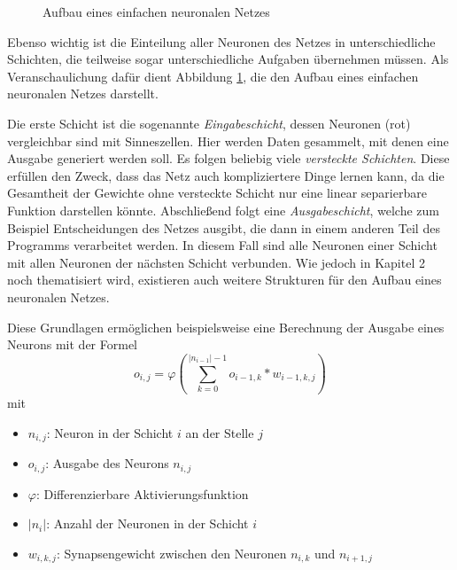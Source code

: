 \documentclass[12pt,a4]{article}
\begin{document}
\begin{figure}[!h]
\caption{Aufbau eines einfachen neuronalen Netzes}
\label{fig:Netzaufbau}
\end{figure}

Ebenso wichtig ist die Einteilung aller Neuronen des Netzes in unterschiedliche Schichten, die teilweise sogar unterschiedliche Aufgaben übernehmen müssen. Als Veranschaulichung dafür dient Abbildung \ref{fig:Netzaufbau}, die den Aufbau eines einfachen neuronalen Netzes darstellt. 

Die erste Schicht ist die sogenannte \textit{Eingabeschicht}, dessen Neuronen (rot) vergleichbar sind mit Sinneszellen. Hier werden Daten gesammelt, mit denen eine Ausgabe generiert werden soll. Es folgen beliebig viele \textit{versteckte Schichten}. Diese erfüllen den Zweck, dass das Netz auch kompliziertere Dinge lernen kann, da die Gesamtheit der Gewichte ohne versteckte Schicht nur eine linear separierbare Funktion darstellen könnte. Abschließend folgt eine \textit{Ausgabeschicht}, welche zum Beispiel Entscheidungen des Netzes ausgibt, die dann in einem anderen Teil des Programms verarbeitet werden. In diesem Fall sind alle Neuronen einer Schicht mit allen Neuronen der nächsten Schicht verbunden. Wie jedoch in Kapitel 2 noch thematisiert wird, existieren auch weitere Strukturen für den Aufbau eines neuronalen Netzes.

Diese Grundlagen ermöglichen beispielsweise eine Berechnung der Ausgabe eines Neurons mit der Formel
\begin{equation}
o_{i, j} = \varphi \left( \sum\limits_{k=0}^{|n_{i-1}| - 1} o_{i-1, k} * w_{i - 1, k, j} \right)
\end{equation}
mit
\begin{itemize}
\item $n_{i, j}$: Neuron in der Schicht $i$ an der Stelle $j$
\item $o_{i, j}$: Ausgabe des Neurons $n_{i, j}$
\item $\varphi$: Differenzierbare Aktivierungsfunktion
\item $|n_i|$: Anzahl der Neuronen in der Schicht $i$
\item $w_{i, k, j}$: Synapsengewicht zwischen den Neuronen $n_{i, k}$ und $n_{i+1, j}$
\end{itemize}
\end{document}
